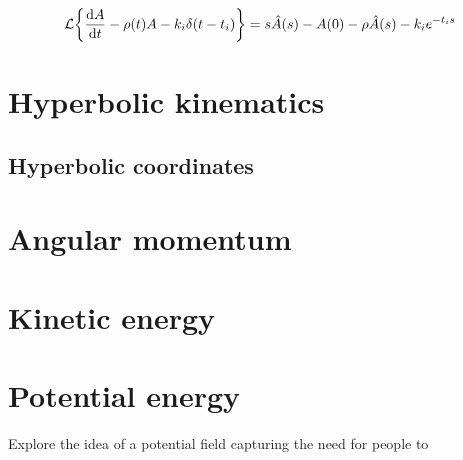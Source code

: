 \begin{equation}
    \mathcal{L} 
    \qty{\dv{\amnt}{t} - \hanv(t) \amnt - k_i \delta(t - t_i)} = s\hat{\amnt}(s) - A(0) - \hanv\hat{\amnt}(s) - k_i e^{-t_i s}
\end{equation}

\section{Hyperbolic kinematics}
\subsection{Hyperbolic coordinates}

\section{Angular momentum}

\section{Kinetic energy}

\section{Potential energy}
Explore the idea of a potential field capturing the need for people to
